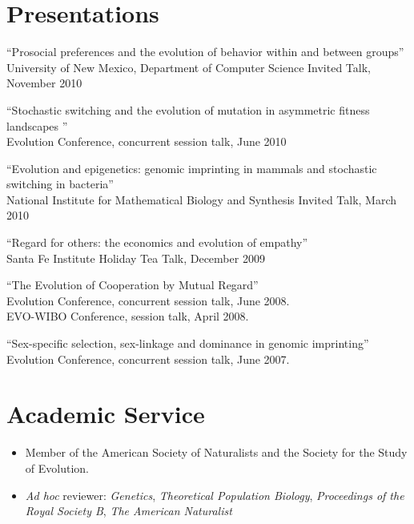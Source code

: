 \documentclass[overlapped,line]{res}
\begin{document}
\begin{resume}



\section{\bf \large Presentations}

``Prosocial preferences and the evolution of behavior within and between groups'' \\
University of New Mexico, Department of Computer Science Invited Talk, November 2010

``Stochastic switching and the evolution of mutation in asymmetric fitness landscapes '' \\
Evolution Conference, concurrent session talk, June 2010

``Evolution and epigenetics: genomic imprinting in mammals and stochastic switching in bacteria'' \\
National Institute for Mathematical Biology and Synthesis Invited Talk, March 2010

``Regard for others: the economics and evolution of empathy'' \\
Santa Fe Institute Holiday Tea Talk, December 2009

``The Evolution of Cooperation by Mutual Regard'' \\
Evolution Conference, concurrent session talk, June 2008. \\
EVO-WIBO Conference, session talk, April 2008. 

``Sex-specific selection, sex-linkage and dominance in genomic imprinting'' \\
Evolution Conference, concurrent session talk, June 2007. 


\newpage

\section{\bf \large Academic Service}
\begin{itemize}[$\ast$]
\item Member of the American Society of Naturalists and the Society for the Study of Evolution.
\item \textit{Ad hoc} reviewer: \textit{Genetics}, \textit{Theoretical Population Biology}, \textit{Proceedings of the Royal Society B}, \textit{The American Naturalist} 
\end{itemize}


\end{resume}
\end{document}
